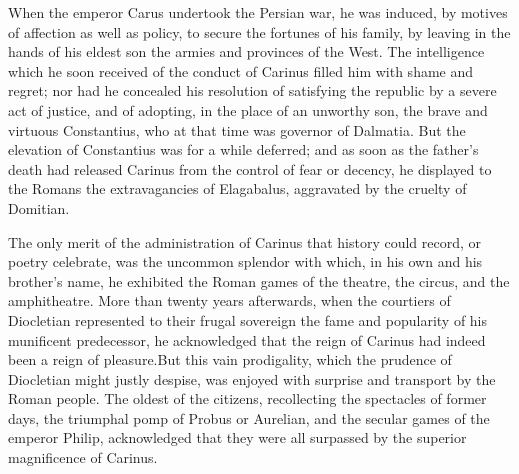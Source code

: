 

When the emperor Carus undertook the Persian war, he was induced,
by motives of affection as well as policy, to secure the fortunes
of his family, by leaving in the hands of his eldest son the
armies and provinces of the West. The intelligence which he soon
received of the conduct of Carinus filled him with shame and
regret; nor had he concealed his resolution of satisfying the
republic by a severe act of justice, and of adopting, in the
place of an unworthy son, the brave and virtuous Constantius, who
at that time was governor of Dalmatia. But the elevation of
Constantius was for a while deferred; and as soon as the father’s
death had released Carinus from the control of fear or decency,
he displayed to the Romans the extravagancies of Elagabalus,
aggravated by the cruelty of Domitian.\footnotemark[82]


The only merit of the administration of Carinus that history
could record, or poetry celebrate, was the uncommon splendor with
which, in his own and his brother’s name, he exhibited the Roman
games of the theatre, the circus, and the amphitheatre. More than
twenty years afterwards, when the courtiers of Diocletian
represented to their frugal sovereign the fame and popularity of
his munificent predecessor, he acknowledged that the reign of
Carinus had indeed been a reign of pleasure.\footnotemark[83] But this vain
prodigality, which the prudence of Diocletian might justly
despise, was enjoyed with surprise and transport by the Roman
people. The oldest of the citizens, recollecting the spectacles
of former days, the triumphal pomp of Probus or Aurelian, and the
secular games of the emperor Philip, acknowledged that they were
all surpassed by the superior magnificence of Carinus.\footnotemark[84]


